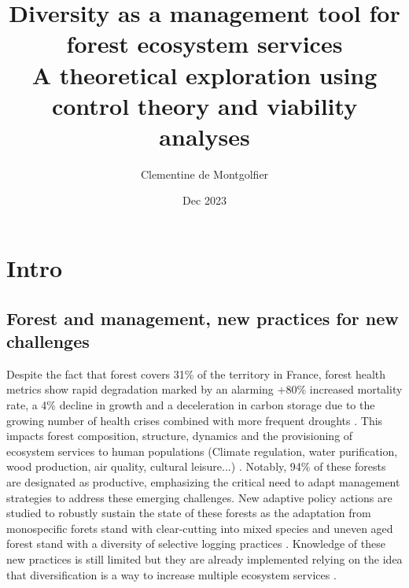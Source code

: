 \documentclass{article}
\title{Diversity as a management tool for forest ecosystem services \\ 
\large A theoretical exploration using control theory and viability analyses}
\author{Clementine de Montgolfier}
\date{Dec 2023}
\begin{document}





\newpage



\newpage

\begin{singlespace}
    \tableofcontents
\end{singlespace}

\newpage


\section{Intro}

\subsection{Forest and management, new practices for new challenges}

Despite the fact that forest covers 31\% of the territory in France, forest health metrics show rapid degradation  marked by an alarming +80\% increased mortality rate, a 4\% decline in growth and a deceleration in carbon storage due to the growing number of health crises combined with more frequent droughts \autocite{IGN}. This impacts forest composition, structure, dynamics and the provisioning of ecosystem services to human populations (Climate regulation, water purification, wood production, air quality, cultural leisure...) \autocite{grammatikopoulouValueForestEcosystem2021}. Notably, 94\% of these forests are designated as productive, emphasizing the critical need to adapt management strategies to address these emerging challenges. 
New adaptive policy actions are studied to robustly sustain the state of these forests as the adaptation from monospecific forets stand with clear-cutting into mixed species and uneven aged forest stand with a diversity of selective logging practices \autocite{raymondIrregularShelterwoodSystem2009}. Knowledge of these new practices is still limited but they are already implemented relying on the idea that diversification is a way to increase multiple ecosystem services \autocite{tilmanBiodiversityPopulationEcosystem1996}.
\end{document}

